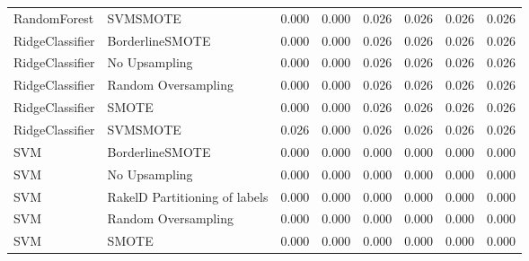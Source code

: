 \begin{tabular}{llllllll}
                   RandomForest &                      SVMSMOTE & 0.000 &                     0.000 &                 0.026 &                  0.026 &                                   0.026 &    0.026 \\
                RidgeClassifier &               BorderlineSMOTE & 0.000 &                     0.000 &                 0.026 &                  0.026 &                                   0.026 &    0.026 \\
                RidgeClassifier &                 No Upsampling & 0.000 &                     0.000 &                 0.026 &                  0.026 &                                   0.026 &    0.026 \\
                RidgeClassifier &           Random Oversampling & 0.000 &                     0.000 &                 0.026 &                  0.026 &                                   0.026 &    0.026 \\
                RidgeClassifier &                         SMOTE & 0.000 &                     0.000 &                 0.026 &                  0.026 &                                   0.026 &    0.026 \\
                RidgeClassifier &                      SVMSMOTE & 0.026 &                     0.000 &                 0.026 &                  0.026 &                                   0.026 &    0.026 \\
                            SVM &               BorderlineSMOTE & 0.000 &                     0.000 &                 0.000 &                  0.000 &                                   0.000 &    0.000 \\
                            SVM &                 No Upsampling & 0.000 &                     0.000 &                 0.000 &                  0.000 &                                   0.000 &    0.000 \\
                            SVM & RakelD Partitioning of labels & 0.000 &                     0.000 &                 0.000 &                  0.000 &                                   0.000 &    0.000 \\
                            SVM &           Random Oversampling & 0.000 &                     0.000 &                 0.000 &                  0.000 &                                   0.000 &    0.000 \\
                            SVM &                         SMOTE & 0.000 &                     0.000 &                 0.000 &                  0.000 &                                   0.000 &    0.000 \\

\end{tabular}
